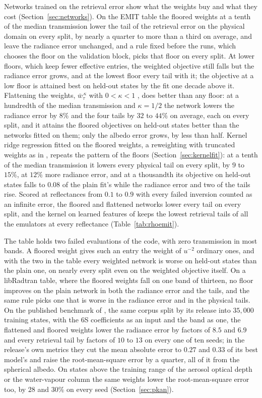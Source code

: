 \documentclass[11pt]{article}
\theoremstyle{remark}
\newcommand{\1}{\mathbf{1}}
\begin{document}
Networks trained on the retrieval error show what the weights buy and what they cost (Section~\ref{sec:networks}). On
the EMIT table the floored weights at a tenth of the median transmission lower the tail of the retrieval error on the
physical domain on every split, by nearly a quarter to more than a third on average, and leave the radiance error
unchanged, and a rule fixed before the runs, which chooses the floor on the validation block, picks that floor on every
split. At lower floors, which keep fewer effective entries, the weighted objective still falls but the radiance error
grows, and at the lowest floor every tail with it; the objective at a low floor is attained best on held-out states by
the fit one decade above it. Flattening the weights, $\bar w_\tau^{\,\kappa}$ with $0<\kappa<1$ \cite{shimodaira}, does
better than any floor: at a hundredth of the median transmission and $\kappa=1/2$ the network lowers the radiance error
by $8\%$ and the four tails by $32$ to $44\%$ on average, each on every split, and it attains the floored objectives on
held-out states better than the networks fitted on them; only the albedo error grows, by less than half. Kernel ridge
regression fitted on the floored weights, a reweighting with truncated weights as in \cite{mpw}, repeats the pattern of the floors
(Section~\ref{sec:kernelfit}): at a tenth of the median transmission it lowers every physical tail on every split, by
$9$ to $15\%$, at $12\%$ more radiance error, and at a thousandth its objective on held-out states falls to $0.08$ of the
plain fit's while the radiance error and two of the tails rise. Scored at reflectances from $0.1$ to $0.9$ with every
failed inversion counted as an infinite error, the floored and flattened networks lower every tail on every split, and
the kernel on learned features of \cite{shmalo2} keeps the lowest retrieval tails of all the emulators at every
reflectance (Table~\ref{tab:rhoemit}).

The table holds two failed evaluations of the code, with zero transmission in most bands. A floored weight gives such
an entry the weight of $u^{-2}$ ordinary ones, and with the two in the table every weighted network is worse on held-out
states than the plain one, on nearly every split even on the weighted objective itself. On a libRadtran table, where
the floored weights fall on one band of thirteen, no floor improves on the plain network in both the radiance error and
the tails, and the same rule picks one that is worse in the radiance error and in the physical tails. On the published
benchmark of \cite{pkan}, the same corpus split by its release into $35{,}000$ training states, with the 6S coefficients
as an input and the band as one, the flattened and floored weights lower the radiance error by factors of $8.5$ and $6.9$
and every retrieval tail by factors of $10$ to $13$ on every one of ten seeds; in the release's own metrics they cut the
mean absolute error to $0.27$ and $0.33$ of its best model's and raise the root-mean-square error by a quarter, all of it
from the spherical albedo. On states above the training range of the aerosol optical depth or the water-vapour column
the same weights lower the root-mean-square error too, by $28$ and $30\%$ on every seed (Section~\ref{sec:pkan}).
\end{document}
